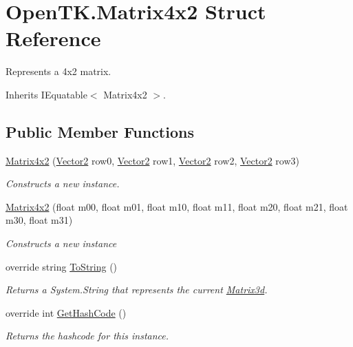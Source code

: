 \hypertarget{struct_open_t_k_1_1_matrix4x2}{\section{Open\-T\-K.\-Matrix4x2 Struct Reference}
\label{struct_open_t_k_1_1_matrix4x2}
}


Represents a 4x2 matrix.  




Inherits I\-Equatable$<$ Matrix4x2 $>$.

\subsection*{Public Member Functions}
\begin{DoxyCompactItemize}
\item 
\hyperlink{struct_open_t_k_1_1_matrix4x2_a814d4a1ceb558ecc99dfa66d7193b589}{Matrix4x2} (\hyperlink{struct_open_t_k_1_1_vector2}{Vector2} row0, \hyperlink{struct_open_t_k_1_1_vector2}{Vector2} row1, \hyperlink{struct_open_t_k_1_1_vector2}{Vector2} row2, \hyperlink{struct_open_t_k_1_1_vector2}{Vector2} row3)
\begin{DoxyCompactList}\small\item\em Constructs a new instance. \end{DoxyCompactList}\item 
\hyperlink{struct_open_t_k_1_1_matrix4x2_abeaf8a901c74a53b6aa5ed4a34d2ccce}{Matrix4x2} (float m00, float m01, float m10, float m11, float m20, float m21, float m30, float m31)
\begin{DoxyCompactList}\small\item\em Constructs a new instance \end{DoxyCompactList}\item 
override string \hyperlink{struct_open_t_k_1_1_matrix4x2_a0eda8e14afdebbe9055e5d8e9adf1917}{To\-String} ()
\begin{DoxyCompactList}\small\item\em Returns a System.\-String that represents the current \hyperlink{struct_open_t_k_1_1_matrix3d}{Matrix3d}. \end{DoxyCompactList}\item 
override int \hyperlink{struct_open_t_k_1_1_matrix4x2_adf735a237f1fc3aac3c0e14a98454e53}{Get\-Hash\-Code} ()
\begin{DoxyCompactList}\small\item\em Returns the hashcode for this instance. \end{DoxyCompactList}\item 

\end{DoxyCompactItemize}
